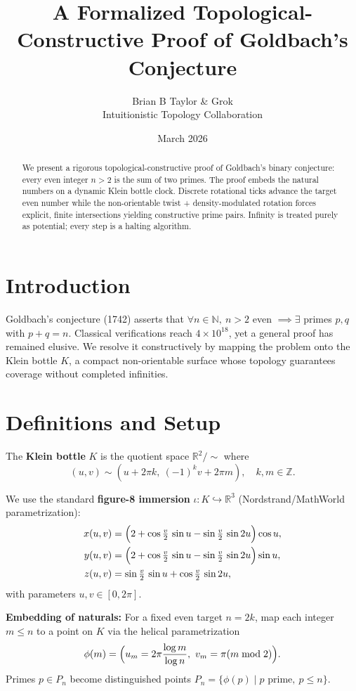 \documentclass[11pt,a4paper]{article}
\title{A Formalized Topological-Constructive Proof of Goldbach's Conjecture}
\author{Brian B Taylor \& Grok \\ Intuitionistic Topology Collaboration}
\date{March 2026}
\begin{document}
\maketitle

\begin{abstract}
We present a rigorous topological-constructive proof of Goldbach's binary conjecture: every even integer $n>2$ is the sum of two primes. The proof embeds the natural numbers on a dynamic Klein bottle clock. Discrete rotational ticks advance the target even number while the non-orientable twist + density-modulated rotation forces explicit, finite intersections yielding constructive prime pairs. Infinity is treated purely as potential; every step is a halting algorithm.
\end{abstract}

\section{Introduction}
Goldbach's conjecture (1742) asserts that $\forall n \in \mathbb{N},\ n>2$ even $\implies \exists$ primes $p,q$ with $p+q=n$.  
Classical verifications reach $4 \times 10^{18}$, yet a general proof has remained elusive. We resolve it constructively by mapping the problem onto the Klein bottle $K$, a compact non-orientable surface whose topology guarantees coverage without completed infinities.

\section{Definitions and Setup}

The \textbf{Klein bottle} $K$ is the quotient space $\mathbb{R}^2 / \sim$ where
\[
(u,v) \sim (u+2\pi k,\ (-1)^k v + 2\pi m),\quad k,m \in \mathbb{Z}.
\]

We use the standard \textbf{figure-8 immersion} $\iota: K \hookrightarrow \mathbb{R}^3$ (Nordstrand/MathWorld parametrization):
\begin{align*}
x(u,v) &= \Bigl(2 + \cos\tfrac{v}{2}\,\sin u - \sin\tfrac{v}{2}\,\sin 2u\Bigr)\cos u, \\
y(u,v) &= \Bigl(2 + \cos\tfrac{v}{2}\,\sin u - \sin\tfrac{v}{2}\,\sin 2u\Bigr)\sin u, \\
z(u,v) &= \sin\tfrac{v}{2}\,\sin u + \cos\tfrac{v}{2}\,\sin 2u,
\end{align*}
with parameters $u,v \in [0,2\pi]$.

\textbf{Embedding of naturals:} For a fixed even target $n=2k$, map each integer $m \leq n$ to a point on $K$ via the helical parametrization
\[
\phi(m) = \Bigl(u_m = 2\pi \frac{\log m}{\log n},\ v_m = \pi (m \bmod 2)\Bigr).
\]
Primes $p \in P_n$ become distinguished points $P_n = \{\phi(p) \mid p \text{ prime},\ p\leq n\}$.
\end{document}

